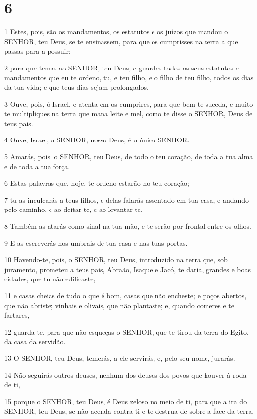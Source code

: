 \chapter{6}

\par 1 Estes, pois, são os mandamentos, os estatutos e os juízos que mandou o SENHOR, teu Deus, se te ensinassem, para que os cumprisses na terra a que passas para a possuir;
\par 2 para que temas ao SENHOR, teu Deus, e guardes todos os seus estatutos e mandamentos que eu te ordeno, tu, e teu filho, e o filho de teu filho, todos os dias da tua vida; e que teus dias sejam prolongados.
\par 3 Ouve, pois, ó Israel, e atenta em os cumprires, para que bem te suceda, e muito te multipliques na terra que mana leite e mel, como te disse o SENHOR, Deus de teus pais.
\par 4 Ouve, Israel, o SENHOR, nosso Deus, é o único SENHOR.
\par 5 Amarás, pois, o SENHOR, teu Deus, de todo o teu coração, de toda a tua alma e de toda a tua força.
\par 6 Estas palavras que, hoje, te ordeno estarão no teu coração;
\par 7 tu as inculcarás a teus filhos, e delas falarás assentado em tua casa, e andando pelo caminho, e ao deitar-te, e ao levantar-te.
\par 8 Também as atarás como sinal na tua mão, e te serão por frontal entre os olhos.
\par 9 E as escreverás nos umbrais de tua casa e nas tuas portas.
\par 10 Havendo-te, pois, o SENHOR, teu Deus, introduzido na terra que, sob juramento, prometeu a teus pais, Abraão, Isaque e Jacó, te daria, grandes e boas cidades, que tu não edificaste;
\par 11 e casas cheias de tudo o que é bom, casas que não encheste; e poços abertos, que não abriste; vinhais e olivais, que não plantaste; e, quando comeres e te fartares,
\par 12 guarda-te, para que não esqueças o SENHOR, que te tirou da terra do Egito, da casa da servidão.
\par 13 O SENHOR, teu Deus, temerás, a ele servirás, e, pelo seu nome, jurarás.
\par 14 Não seguirás outros deuses, nenhum dos deuses dos povos que houver à roda de ti,
\par 15 porque o SENHOR, teu Deus, é Deus zeloso no meio de ti, para que a ira do SENHOR, teu Deus, se não acenda contra ti e te destrua de sobre a face da terra.
